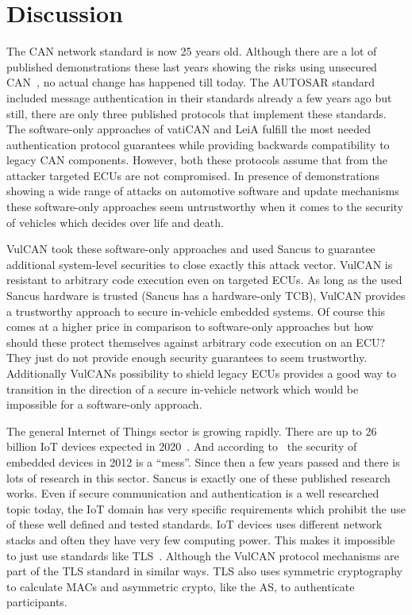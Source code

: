 
\section{Discussion}\label{sec:discussion}

The CAN network standard is now 25 years old. Although there are a lot of
published demonstrations these last years showing the risks using unsecured
CAN~\cite{Koscher2010,Hoppe2011,Checkoway2011,Cheah2017}, no actual change has
happened till today. The AUTOSAR standard included message authentication in
their standards already a few years ago but still, there are only three
published protocols that implement these standards. The software-only approaches
of vatiCAN and LeiA fulfill the most needed authentication protocol guarantees
while providing backwards compatibility to legacy CAN components. However, both
these protocols assume that from the attacker targeted ECUs are not compromised.
In presence of demonstrations showing a wide range of attacks on automotive
software and update mechanisms~\cite{Checkoway2011,Koscher2010} these
software-only approaches seem untrustworthy when it comes to the security of
vehicles which decides over life and death.

VulCAN took these software-only approaches and used Sancus to guarantee
additional system-level securities to close exactly this attack vector. VulCAN
is resistant to arbitrary code execution even on targeted ECUs. As long as the
used Sancus hardware is trusted (Sancus has a hardware-only TCB), VulCAN
provides a trustworthy approach to secure in-vehicle embedded systems. Of course
this comes at a higher price in comparison to software-only approaches but how
should these protect themselves against arbitrary code execution on an ECU\@?
They just do not provide enough security guarantees to seem trustworthy.
Additionally VulCANs possibility to shield legacy ECUs provides a good way to
transition in the direction of a secure in-vehicle network which would be
impossible for a software-only approach.

The general Internet of Things sector is growing rapidly. There are up to 26
billion IoT devices expected in 2020~\cite{gartner13}. And according
to~\cite{Viega2012} the security of embedded devices in 2012 is a ``mess''.
Since then a few years passed and there is lots of research in this sector.
Sancus is exactly one of these published research works. Even if secure
communication and authentication is a well researched topic today, the IoT
domain has very specific requirements which prohibit the use of these well
defined and tested standards. IoT devices uses different network stacks and
often they have very few computing power. This makes it impossible to just use
standards like TLS~\cite{Dierks2008}. Although the VulCAN protocol mechanisms are part
of the TLS standard in similar ways. TLS also uses symmetric cryptography to
calculate MACs and asymmetric crypto, like the AS, to authenticate participants.

